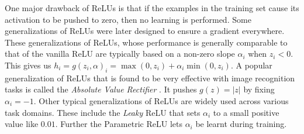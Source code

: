 \documentclass[14pt]{extarticle}
\numberwithin{equation}{section}
\begin{document}
	One major drawback of ReLUs is that if the examples in the training set cause its activation to be pushed to zero, then no learning is performed. Some generalizations of ReLUs were later designed to ensure a gradient everywhere. These generalizations of ReLUs, whose performance is generally comparable to that of the vanilla ReLU are typically based on a non-zero slope $\alpha_i$ when $z_i < 0$. This gives us  $h_i = g(z_i,\alpha)_i = \max(0,z_i) + \alpha_i \min(0,z_i)$. A popular generalization of ReLUs that is found to be very effective with image recognition tasks is called the \textit{Absolute Value Rectifier} \cite{jarrett2009best}. It pushes $g(z) = |z| $ by fixing $\alpha_i = -1$. Other typical generalizations of ReLUs are widely used across various task domains. These include the \textit{Leaky} ReLU that sets $\alpha_i$ to a small positive value like $0.01$\cite{maas2013rectifier}. Further the Parametric ReLU lets $\alpha_i$ be learnt during training\cite{he2015delving}.
\end{document}
